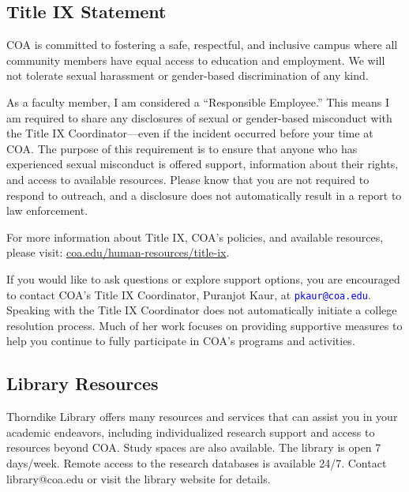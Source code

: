 \documentclass[12pt]{article}
\begin{document}
\subsection{Title IX Statement}
COA is committed to fostering a safe, respectful, and inclusive campus where all community
members have equal access to education and employment.
We will not tolerate sexual harassment or gender-based discrimination of any kind.

As a faculty member, I am considered a “Responsible Employee.”
This means I am required to share any disclosures of sexual or gender-based misconduct with the Title IX Coordinator—even if the incident occurred before your time at COA.
The purpose of this requirement is to ensure that anyone who has experienced sexual misconduct is offered support, information about their rights, and access to available resources. Please know that you are not required to respond to outreach, and a disclosure does not automatically result in a report to law enforcement.

For more information about Title IX, COA’s policies, and available resources, please visit:
\url{coa.edu/human-resources/title-ix}.

If you would like to ask questions or explore support options, you are encouraged to contact
COA’s Title IX Coordinator, Puranjot Kaur, at \textcolor{blue}{\texttt{pkaur@coa.edu}}.
Speaking with the Title IX Coordinator does not automatically initiate a college resolution process.
Much of her work focuses on providing supportive measures to help you continue to fully participate in COA’s programs and activities.

\subsection{Library Resources}
Thorndike Library offers many resources and services that can assist you in your academic endeavors, including individualized research support and access to resources beyond COA.  Study spaces are also available.  The library is open 7 days/week.  Remote access to the research databases is available 24/7.  Contact library@coa.edu or visit the library website for details.
\end{document}
